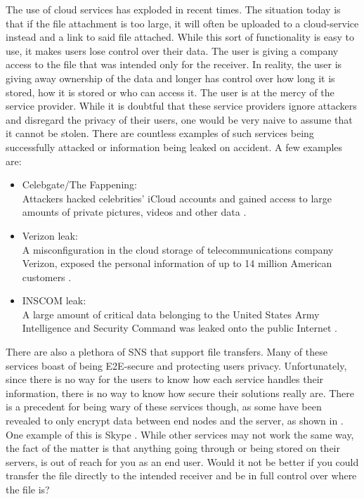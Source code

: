 The use of cloud services has exploded in recent times. The situation today is that if the file attachment is too large, it will often be uploaded to a cloud-service instead and a link to said file attached. While this sort of functionality is easy to use, it makes users lose control over their data. The user is giving a company access to the file that was intended only for the receiver. In reality, the user is giving away ownership of the data and longer has control over how long it is stored, how it is stored or who can access it. The user is at the mercy of the service provider. While it is doubtful that these service providers ignore attackers and disregard the privacy of their users, one would be very naive to assume that it cannot be stolen. There are countless examples of such services being successfully attacked or information being leaked on accident. A few examples are:
\begin{itemize}
	\item Celebgate/The Fappening:\\
	Attackers hacked celebrities' iCloud accounts and gained access to large amounts of private pictures, videos and other data \cite{CelebgateTwoMethodological}.
	\item Verizon leak:\\
	A misconfiguration in the cloud storage of telecommunications company Verizon, exposed the personal information of up to 14 million American customers \cite{CloudLeakHow}.
	\item INSCOM leak:\\
	A large amount of critical data belonging to the United States Army Intelligence and Security Command was leaked onto the public Internet \cite{osullivanBlackBoxRed}.
\end{itemize}

There are also a plethora of SNS that support file transfers. Many of these services boast of being E2E-secure and protecting users privacy. Unfortunately, since there is no way for the users to know how each service handles their information, there is no way to know how secure their solutions really are. There is a precedent for being wary of these services though, as some have been revealed to only encrypt data between end nodes and the server, as shown in .  One example of this is Skype \cite{greenwaldMicrosoftHandedNSA2013,popaSkypeProvidedBackdoor,ItSafeTransfer}. While other services may not work the same way, the fact of the matter is that anything going through or being stored on their servers, is out of reach for you as an end user. Would it not be better if you could transfer the file directly to the intended receiver and be in full control over where the file is?
%
